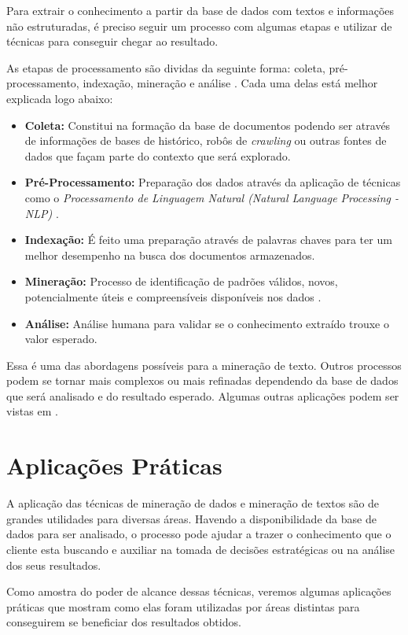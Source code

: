 \documentclass[conference]{IEEEtran}
\begin{document}
Para extrair o conhecimento a partir da base de dados com textos e informações não estruturadas, é preciso seguir um processo com algumas etapas e utilizar de técnicas para conseguir chegar ao resultado. 

As etapas de processamento são dividas da seguinte forma: coleta, pré-processamento, indexação, mineração e análise \cite{art1}. Cada uma delas está melhor explicada logo abaixo:
\begin{itemize}
    \item \textbf{Coleta:} 
    Constitui na formação da base de documentos podendo ser através de informações de bases de histórico, robôs de \textit{crawling} ou outras fontes de dados que façam parte do contexto que será explorado.
    \item \textbf{Pré-Processamento:} Preparação dos dados através da aplicação de técnicas como o \textit{Processamento de Linguagem Natural (Natural Language Processing - NLP)} \cite{art10}.
    \item \textbf{Indexação:} É feito uma preparação através de palavras chaves para ter um melhor desempenho na busca dos documentos armazenados.
    \item \textbf{Mineração:} Processo de identificação de
    padrões válidos, novos, potencialmente úteis e compreensíveis disponíveis nos dados \cite{art9}. 
    \item \textbf{Análise:} Análise humana para validar se o conhecimento extraído trouxe o valor esperado.
\end{itemize} 

Essa é uma das abordagens possíveis para a mineração de texto. Outros processos podem se tornar mais complexos ou mais refinadas dependendo da base de dados que será analisado e do resultado esperado. Algumas outras aplicações podem ser vistas em \cite{art2,art9,art10}.

\section{Aplicações Práticas}\label{aplicacoes}

A aplicação das técnicas de mineração de dados e mineração de textos são de grandes utilidades para diversas áreas. Havendo a disponibilidade da base de dados para ser analisado, o processo pode ajudar a trazer o conhecimento que o cliente esta buscando e auxiliar na tomada de decisões estratégicas ou na análise dos seus resultados.

Como amostra do poder de alcance dessas técnicas, veremos algumas aplicações práticas que mostram como elas foram utilizadas por áreas distintas para conseguirem se beneficiar dos resultados obtidos.
\end{document}
